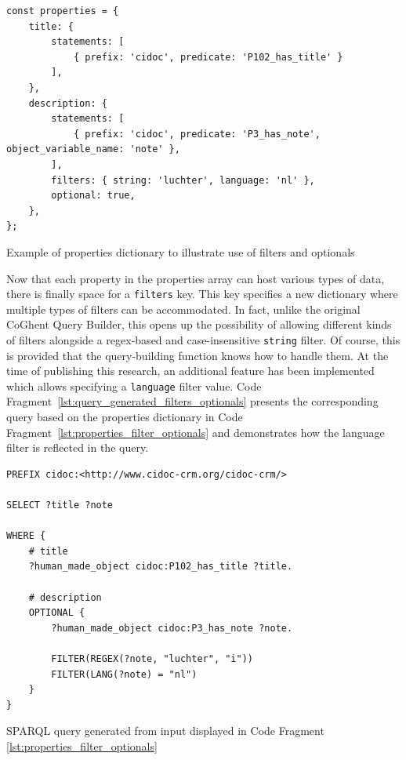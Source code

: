 \begin{listing}[htbp]
    \begin{verbatim}
const properties = {
    title: {
        statements: [
            { prefix: 'cidoc', predicate: 'P102_has_title' }
        ],
    },
    description: {
        statements: [
            { prefix: 'cidoc', predicate: 'P3_has_note', object_variable_name: 'note' },
        ],
        filters: { string: 'luchter', language: 'nl' },
        optional: true,
    },
};
    \end{verbatim}
    \caption{Example of properties dictionary to illustrate use of filters and optionals}
    \label{lst:properties_filter_optionals}
\end{listing}

Now that each property in the properties array can host various types of data, there is finally space for a \texttt{filters} key. This key specifies a new dictionary where multiple types of filters can be accommodated. In fact, unlike the original CoGhent Query Builder, this opens up the possibility of allowing different kinds of filters alongside a regex-based and case-insensitive \texttt{string} filter. Of course, this is provided that the query-building function knows how to handle them. At the time of publishing this research, an additional feature has been implemented which allows specifying a \texttt{language} filter value. Code Fragment~\ref{lst:query_generated_filters_optionals} presents the corresponding query based on the properties dictionary in Code Fragment~\ref{lst:properties_filter_optionals} and demonstrates how the language filter is reflected in the query.

\begin{listing}[htbp]
    \begin{verbatim}
PREFIX cidoc:<http://www.cidoc-crm.org/cidoc-crm/>

SELECT ?title ?note

WHERE {
    # title
    ?human_made_object cidoc:P102_has_title ?title.
    
    # description
    OPTIONAL {
        ?human_made_object cidoc:P3_has_note ?note.
        
        FILTER(REGEX(?note, "luchter", "i"))
        FILTER(LANG(?note) = "nl")
    }
}
    \end{verbatim}
    \caption{SPARQL query generated from input displayed in Code Fragment \ref{lst:properties_filter_optionals}}
    \label{lst:query_generated_filters_optionals}
\end{listing}

